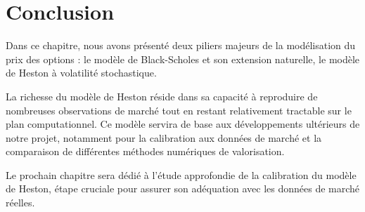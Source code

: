 \section{Conclusion}

Dans ce chapitre, nous avons présenté deux piliers majeurs de la modélisation du prix des options : le modèle de Black-Scholes et son extension naturelle, le modèle de Heston à volatilité stochastique.



La richesse du modèle de Heston réside dans sa capacité à reproduire de nombreuses observations de marché tout en restant relativement tractable sur le plan computationnel. Ce modèle servira de base aux développements ultérieurs de notre projet, notamment pour la calibration aux données de marché et la comparaison de différentes méthodes numériques de valorisation.

Le prochain chapitre sera dédié à l'étude approfondie de la calibration du modèle de Heston, étape cruciale pour assurer son adéquation avec les données de marché réelles.



